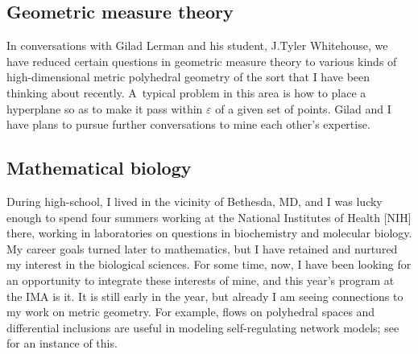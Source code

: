 \documentclass[11pt]{proposal}
\begin{document}
\subsection{Geometric measure theory}\label{gilad}%

In conversations with Gilad Lerman and his student,
J.\thinspace{}Tyler Whitehouse, we have reduced certain questions in
geometric measure theory to various kinds of high-dimensional metric
polyhedral geometry of the sort that I have been thinking about
recently.  A~typical problem in this area is how to place a hyperplane
so as to make it pass within $\varepsilon$ of a given set of points.
Gilad and I have plans to pursue further conversations to mine each
other's expertise.

\subsection{Mathematical biology}\label{bio}%

During high-school, I lived in the vicinity of Bethesda, MD, and I was
lucky enough to spend four summers working at the National Institutes
of Health [NIH] there, working in laboratories on questions in
biochemistry and molecular biology.  My career goals turned later to
mathematics, but I have retained and nurtured my interest in the
biological sciences.  For some time, now, I have been looking for an
opportunity to integrate these interests of mine, and this year's
program at the IMA is it.  It is still early in the year, but already
I am seeing connections to my work on metric geometry.  For example,
flows on polyhedral spaces and differential inclusions are useful in
modeling self-regulating network models;
see \cite{CdG06} for an instance of this.
\end{document}
